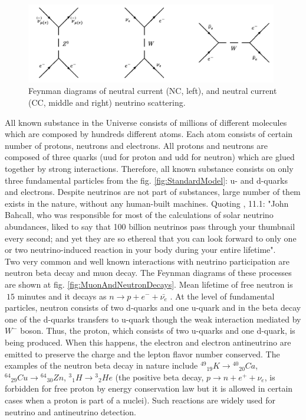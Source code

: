 \begin{figure}
\caption{Feynman diagrams of neutral current (NC, left), and neutral current (CC, middle and right) neutrino scattering.}
\label{fig:NuScattering}
\centering
\includegraphics[width=0.98\textwidth, keepaspectratio=true]{figs/neutrinoScattering.png}
\end{figure}


All known substance in the Universe consists of millions of different molecules which are composed by hundreds different atoms. Each atom consists of certain number of protons, neutrons and electrons. All protons and neutrons are composed of three quarks (uud for proton and udd for neutron) which are glued together by strong interactions. Therefore, all known substance consists on only three fundamental particles from the fig. \ref{fig:StandardModel}: u- and d-quarks and electrons. Despite neutrinos are not part of substances, large number of them exists in the nature, without any human-built machines. Quoting \cite{ref_Griffiths}, 11.1: "John Bahcall, who was responsible for most of the calculations of solar neutrino abundances, liked to say that 100 billion neutrinos pass through your thumbnail every second; and yet they are so ethereal that you can look forward to only one or two neutrino-induced reaction in your body during your entire lifetime".\\
Two very common and well known interactions with neutrino participation are neutron beta decay and muon decay. The Feynman diagrams of these processes are shown at fig. \ref{fig:MuonAndNeutronDecays}. Mean lifetime of free neutron is $~15$ minutes and it decays as $n \rightarrow p + e^- + \bar{{\nu}_e} $ \cite{ref_PDG}. At the level of fundamental particles, neutron consists of two d-quarks and one u-quark and in the beta decay one of the d-quarks transfers to u-quark though the weak interaction mediated by $W^- $ boson. Thus, the proton, which consists of two u-quarks and one d-quark, is being produced. When this happens, the electron and electron antineutrino are emitted to preserve the charge and the lepton flavor number conserved. The examples of the neutron beta decay in nature include ${^{49}}{_{19}}K \rightarrow {^{40}}{_{20}}Ca$, ${^{64}}{_{29}}Cu \rightarrow {^{64}}{_{30}}Zn$, ${^3}{_1}H \rightarrow {^3}{_2}He$ \cite{ref_Griffiths} (the positive beta decay,  $p \rightarrow n + e^+ + {\nu}_e $, is forbidden for free proton by energy conservation law but it is allowed in certain cases when a proton is part of a nuclei). Such reactions are widely used for neutrino and antineutrino detection.\\
